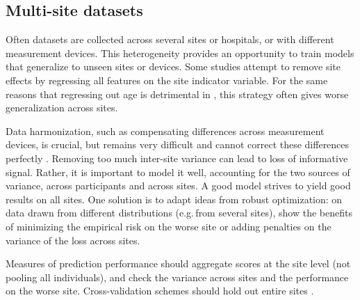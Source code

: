 \documentclass[twocolumn]{article}
\newcommand{\eg}{e.g.\,}
\begin{document}
\subsection{Multi-site datasets}

Often datasets are collected across several sites or hospitals, or with
different measurement devices. This heterogeneity
provides an opportunity to train models that generalize to
unseen sites or devices. Some studies attempt to remove site effects by
regressing all features on the site indicator variable. For the same reasons
that regressing out age is detrimental in , this
strategy often gives worse generalization across sites.

Data harmonization, such as compensating differences across measurement devices, is crucial, but remains very difficult and cannot correct these differences perfectly \citep{glocker2019machine}.
%
Removing too much inter-site variance can lead to loss of informative
signal. Rather, it is important to model it well, accounting for the two
sources of variance, across participants and across sites. A good model
strives to yield good results on all sites. One solution is to adapt
ideas from robust optimization: on data drawn from different
distributions (\eg from several sites), \citet{krueger2020out} show the
benefits of
minimizing the empirical risk on the worse site or adding penalties on the
variance of the loss across sites.

Measures of prediction performance should aggregate scores at
the site level (not pooling all individuals), and check the variance across
sites and the performance on the worse site. Cross-validation schemes should
hold out entire sites \citep{woo2017building,little2017using}.
%


\end{document}
